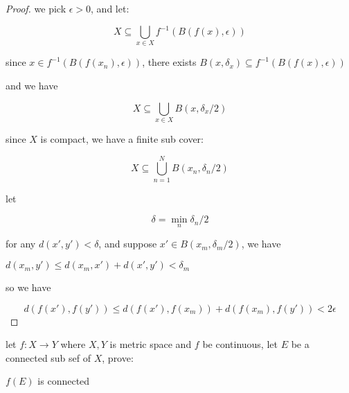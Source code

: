 \begin{proof}
    we pick $\epsilon > 0$, and let: 

    \[
        X \subseteq \bigcup_{x \in X} f^{-1}(B(f(x), \epsilon))
    \]


    since $x \in f^{-1}(B(f(x_n), \epsilon))$, there exists $B(x,\delta_x) \subseteq f^{-1}(B(f(x), \epsilon))$

    and we have

    \[
        X \subseteq \bigcup_{x \in X}B(x, \delta_x / 2)
    \]
    
    since $X$ is compact, we have a finite sub cover:

    \[
        X \subseteq \bigcup_{n=1}^{N} B(x_n, \delta_n/2)
    \]

    let 

    \[
        \delta = \min_{n} \delta_n/2
    \]

    for any $d(x', y') < \delta$, and suppose $x' \in B(x_m, \delta_m/ 2)$, we have

    $d(x_m , y') \le d(x_m, x') + d(x',y') < \delta_m$

    so we have

    \[
        d(f(x'), f(y')) \le d(f(x'), f(x_m)) + d(f(x_m), f(y')) < 2\epsilon
    \]

\end{proof}

\begin{exercise}
    let $f: X \to Y$ where $X, Y$ is metric space and $f$ be continuous, let $E$ be a connected sub sef of $X$, prove:

    $f(E)$ is connected
\end{exercise}

